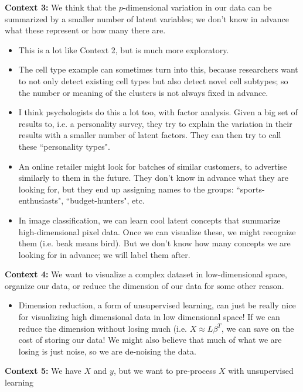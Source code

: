 \begin{list}{}{}
\begin{itemize}
\end{itemize}
\item[\textbf{Context 3:}] We think that the $p$-dimensional variation in our data can be summarized by a smaller number of latent variables; we don't know in advance what these represent or how many there are. 
\begin{itemize}
\item This is a lot like Context 2, but is much more exploratory. 
\item The cell type example can sometimes turn into this, because researchers want to not only detect existing cell types but also detect novel cell subtypes; so the number or meaning of the clusters is not always fixed in advance.
\item I think psychologists do this a lot too, with factor analysis. Given a big set of results to, i.e. a personality survey, they try to explain the variation in their results with a smaller number of latent factors. They can then try to call these ``personality types".
\item An online retailer might look for batches of similar customers, to advertise similarly to them in the future. They don't know in advance what they are looking for, but they end up assigning names to the groups: ``sports-enthusiasts", ``budget-hunters", etc. 
\item In image classification, we can learn cool latent concepts that summarize high-dimensional pixel data. Once we can visualize these, we might recognize them (i.e. beak means bird). But we don't know how many concepts we are looking for in advance; we will label them after. 
\end{itemize}
\item[\textbf{Context 4:}]  We want to visualize a complex dataset in low-dimensional space, organize our data, or reduce the dimension of our data for some other reason.
\begin{itemize}
	\item Dimension reduction, a form of unsupervised learning, can just be really nice for visualizing high dimensional data in low dimensional space! If we can reduce the dimension without losing much (i.e. $X \approx L \beta^T$, we can save on the cost of storing our data! We might also believe that much of what we are losing is just noise, so we are de-noising the data. 
\end{itemize}
\item[\textbf{Context 5:}] We have $X$ and $y$, but we want to pre-process $X$ with unsupervised learning

\end{list}
